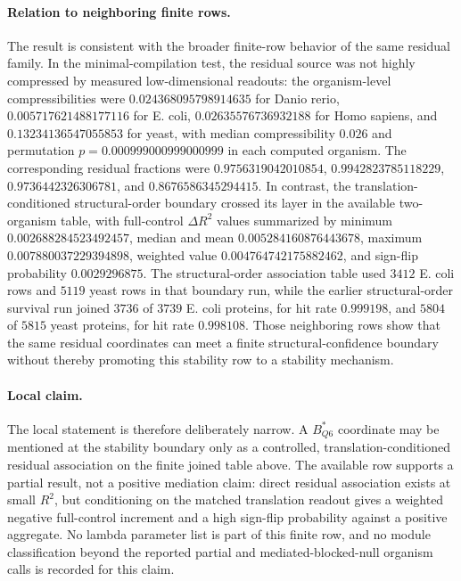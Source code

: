 \paragraph{Relation to neighboring finite rows.}
The result is consistent with the broader finite-row behavior of the same residual family.  In the minimal-compilation test, the residual source was not highly compressed by measured low-dimensional readouts: the organism-level compressibilities were $0.024368095798914635$ for Danio rerio, $0.005717621488177116$ for E. coli, $0.02635576736932188$ for Homo sapiens, and $0.13234136547055853$ for yeast, with median compressibility $0.026$ and permutation $p=0.000999000999000999$ in each computed organism.  The corresponding residual fractions were $0.9756319042010854$, $0.9942823785118229$, $0.9736442326306781$, and $0.8676586345294415$.  In contrast, the translation-conditioned structural-order boundary crossed its layer in the available two-organism table, with full-control $\Delta R^2$ values summarized by minimum $0.002688284523492457$, median and mean $0.005284160876443678$, maximum $0.007880037229394898$, weighted value $0.004764742175882462$, and sign-flip probability $0.0029296875$.  The structural-order association table used $3412$ E. coli rows and $5119$ yeast rows in that boundary run, while the earlier structural-order survival run joined $3736$ of $3739$ E. coli proteins, for hit rate $0.999198$, and $5804$ of $5815$ yeast proteins, for hit rate $0.998108$.  Those neighboring rows show that the same residual coordinates can meet a finite structural-confidence boundary without thereby promoting this stability row to a stability mechanism.

\paragraph{Local claim.}
The local statement is therefore deliberately narrow.  A $B^*_{Q6}$ coordinate may be mentioned at the stability boundary only as a controlled, translation-conditioned residual association on the finite joined table above.  The available row supports a partial result, not a positive mediation claim: direct residual association exists at small $R^2$, but conditioning on the matched translation readout gives a weighted negative full-control increment and a high sign-flip probability against a positive aggregate.  No lambda parameter list is part of this finite row, and no module classification beyond the reported partial and mediated-blocked-null organism calls is recorded for this claim.

